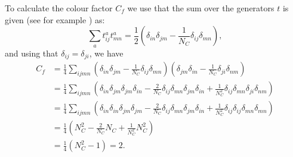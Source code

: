 \documentclass[notes.tex]{subfiles}
\begin{document}
\begin{Answer}
To calculate the colour factor $C_f$ we use that the sum over the generators $t$ is given (see for example \cite{Hiorth:2003ci}) as:
\begin{equation*}
\sum_a t^a_{ij} t^a_{mn} = \frac{1}{2}\left(\delta_{in}\delta_{jm} - \frac{1}{N_C}\delta_{ij}\delta_{mn}\right),
\end{equation*}
and using that $\delta_{ij} = \delta_{ji}$, we have
\begin{align*}
C_f & = \frac{1}{4}\sum_{ijmn}\left(\delta_{in}\delta_{jm} - \frac{1}{N_C}\delta_{ij}\delta_{mn}\right)\left(\delta_{jm}\delta_{in} - \frac{1}{N_C}\delta_{ji}\delta_{nm}\right)\\
& = \frac{1}{4}\sum_{ijmn}\left(\delta_{in}\delta_{jm}\delta_{jm}\delta_{in} -\frac{2}{N_C}\delta_{ij}\delta_{mn}\delta_{jm}\delta_{in} + \frac{1}{N_C^2}\delta_{ij}\delta_{mn}\delta_{ji}\delta_{nm}\right)\\
& = \frac{1}{4}\sum_{ijmn}\left(\delta_{in}\delta_{in}\delta_{jm}\delta_{jm} -\frac{2}{N_C}\delta_{ij}\delta_{mn}\delta_{jm}\delta_{in} + \frac{1}{N_C^2}\delta_{ij}\delta_{ij}\delta_{mn}\delta_{mn}\right)\\
& = \frac{1}{4}\left(N_C^2 - \frac{2}{N_C}N_C + \frac{1}{N_C^2}N_C^2\right)\\
& = \frac{1}{4}(N_C^2 - 1) = 2.
\end{align*}

\end{Answer}
\end{document}
